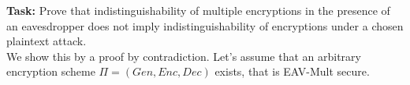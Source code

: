 \textbf{Task:} Prove that indistinguishability of multiple encryptions in the presence of an eavesdropper does
not imply indistinguishability of encryptions under a chosen plaintext attack.\\
We show this by a proof by contradiction. Let's assume that an arbitrary encryption scheme \(\Pi = (Gen, Enc, Dec)\) exists, that is EAV-Mult secure.